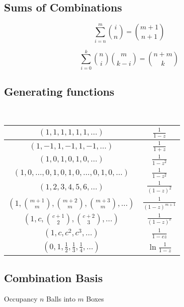     \subsection{Sums of Combinations}

    \begin{equation*}
     \sum_{i = n}^m \binom{i}{n} = \binom{m + 1}{n + 1}
    \end{equation*}

    \begin{equation*}
     \sum_{i = 0}^k \binom{n}{i} \binom{m}{k - i} = \binom{n + m}{k}
    \end{equation*}


    \subsection{Generating functions}
      \ 

      \begin{tabular}{|c|c|}
        \hline
        $(1,1,1,1,1,1,\ldots)$ & $\frac{1}{1-z}$ \\ \hline
        $(1,-1,1,-1,1,-1,\ldots)$ & $\frac{1}{1+z}$ \\ \hline
        $(1,0,1,0,1,0,\ldots)$ & $\frac{1}{1-z^2}$ \\ \hline
        $(1,0,\ldots,0,1,0,1,0,\ldots,0,1,0,\ldots)$ & $\frac{1}{1-z^2}$ \\ \hline
        $(1,2,3,4,5,6,\ldots)$ & $\frac{1}{(1-z)^2}$ \\ \hline
        $(1,\binom{m+1}{m},\binom{m+2}{m},\binom{m+3}{m},\ldots)$ & $\frac{1}{(1-z)^{m+1}}$ \\ \hline
        $(1,c,\binom{c+1}{2},\binom{c+2}{3},\ldots)$ & $\frac{1}{(1-z)^c}$ \\ \hline
        $(1,c,c^2, c^3, \ldots)$ & $\frac{1}{1-cz}$ \\ \hline
        $(0,1,\frac{1}{2},\frac{1}{3},\frac{1}{4},\ldots)$ & $\ln \frac{1}{1-z}$ \\ \hline
      \end{tabular}
      
    \subsection{Combination Basis}
    		Occupancy $n$ Balls into $m$ Boxes
      \ 

